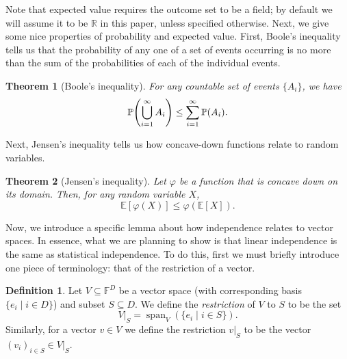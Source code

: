 \documentclass[english,12pt]{reedthesis}
\theoremstyle{plain}
\newtheorem{thm}{Theorem}[section]
\theoremstyle{definition}
\newtheorem{defn}[defn]{Definition}
\theoremstyle{remark}
\DeclareMathOperator{\spn}{span}
\begin{document}
Note that expected value requires the outcome set to be a field; by default we
will assume it to be $\mathbb{R}$ in this paper, unless specified otherwise. Next, we
give some nice properties of probability and expected value. First, Boole's
inequality tells us that the probability of any one of a set of events occurring
is no more than the sum of the probabilities of each of the individual events.

\begin{thm}[{Boole's inequality}]\label{thm:boole-inequality}
  For any countable set of events $\{A_{i}\}$, we have
  \begin{equation}
    \mathbb{P}\mleft(\bigcup_{i=1}^{\infty}A_{i}\mright) \le \sum_{i=1}^{\infty}\mathbb{P}(A_{i}).
  \end{equation}
\end{thm}

Next, Jensen's inequality tells us how concave-down functions relate to random variables.

\begin{thm}[{Jensen's inequality}]\label{thm:jensen-inequality}
  Let $\varphi$ be a function that is concave down on its domain. Then, for any random
  variable $X$,
  \begin{equation}\label{eqn:jensen-inequality}
    \mathbb{E}[\varphi(X)] \le \varphi(\mathbb{E}[X]).
  \end{equation}
\end{thm}

Now, we introduce a specific lemma about how independence relates to vector
spaces. In essence, what we are planning to show is that linear independence is
the same as statistical independence. To do this, first we must briefly
introduce one piece of terminology: that of the restriction of a vector.

\begin{defn}\label{def:restrict-vs}
  Let $V \subseteq \mathbb{F}^{D}$ be a vector space (with corresponding basis
  $\{e_{i} \mid i \in D\}$) and subset $S \subseteq D$. We define the \emph{restriction} of
  $V$ to $S$ to be the set
  \begin{equation}
    V|_{S} = \spn_{V}(\{e_{i} \mid i \in S\}).
  \end{equation}
  Similarly, for a vector $v \in V$ we define the restriction $v|_{S}$ to be the
  vector $(v_{i})_{i \in S} \in V|_{S}$.
\end{defn}
\end{document}
